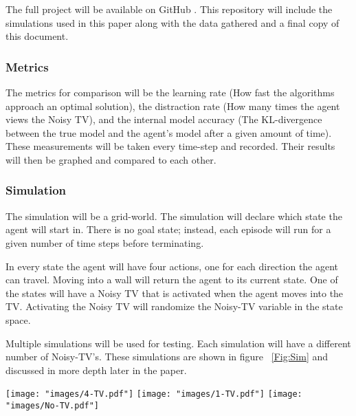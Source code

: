 \documentclass[letterpaper]{article} %
\begin{document}
The full project will be available on GitHub \cite{TPIG:github}. This repository will include the simulations used in this paper along with the data gathered and a final copy of this document.

\subsubsection{Metrics}
The metrics for comparison will be the learning rate (How fast the algorithms approach an optimal solution), the distraction rate (How many times the agent views the Noisy TV), and the internal model accuracy (The KL-divergence between the true model and the agent's model after a given amount of time). These measurements will be taken every time-step and recorded. Their results will then be graphed and compared to each other.


\subsubsection{Simulation}
The simulation will be a grid-world. The simulation will declare which state the agent will start in. There is no goal state; instead, each episode will run for a given number of time steps before terminating.

In every state the agent will have four actions, one for each direction the agent can travel. Moving into a wall will return the agent to its current state. One of the states will have a Noisy TV that is activated when the agent moves into the TV. Activating the Noisy TV will randomize the Noisy-TV variable in the state space.

Multiple simulations will be used for testing. Each simulation will have a different number of Noisy-TV's. These simulations are shown in figure 
\figurename~\ref{Fig:Sim} and discussed in more depth later in the paper.
\begin{figure*}
	\begin{center}
	  \texttt{[image: "images/4-TV.pdf"]}
          \hspace{0.5in}
	  \texttt{[image: "images/1-TV.pdf"]}
          \hspace{0.5in}
	  \texttt{[image: "images/No-TV.pdf"]}
	\end{center}
	\caption{Three example simulations. Each semi-circle is a Noisy-TV. Arrows are one way walls.}
	\label{Fig:Sim}
\end{figure*}
\end{document}
